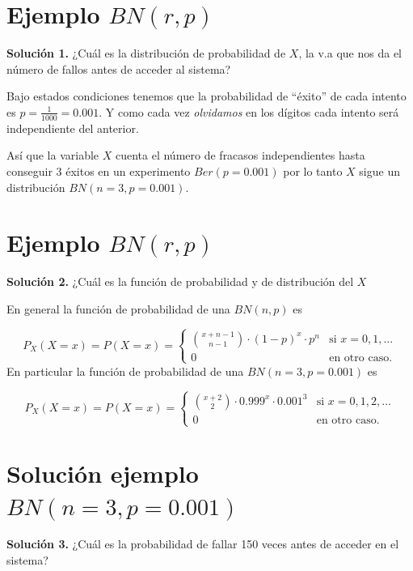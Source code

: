 \documentclass[
  letterpaper,
  DIV=11,
  numbers=noendperiod]{scrreprt}
\begin{document}
\section{\texorpdfstring{Ejemplo
\(BN(r,p)\)}{Ejemplo BN(r,p)}}\label{ejemplo-bnrp}

\textbf{Solución 1.} ¿Cuál es la distribución de probabilidad de \(X\),
la v.a que nos da el número de fallos antes de acceder al sistema?

Bajo estados condiciones tenemos que la probabilidad de ``éxito'' de
cada intento es \(p=\frac{1}{1000}=0.001\). Y como cada vez
\emph{olvidamos} en los dígitos cada intento será independiente del
anterior.

Así que la variable \(X\) cuenta el número de fracasos independientes
hasta conseguir 3 éxitos en un experimento \(Ber(p=0.001)\) por lo tanto
\(X\) sigue un distribución \(BN(n=3,p=0.001).\)

\section{\texorpdfstring{Ejemplo
\(BN(r,p)\)}{Ejemplo BN(r,p)}}\label{ejemplo-bnrp-1}

\textbf{Solución 2.} ¿Cuál es la función de probabilidad y de
distribución del \(X\)

En general la función de probabilidad de una \(BN(n,p)\) es

\[
P_X(X=x)=P(X=x)=
\left\{
\begin{array}{cc} 
{x+n-1\choose n-1} \cdot (1-p)^{x}\cdot p^n & \mbox{si }  x=0,1,\ldots \\ 0 & \mbox{en otro caso.}\end{array}\right.
\] En particular la función de probabilidad de una \(BN(n=3,p=0.001)\)
es

\[
P_X(X=x)=P(X=x)=
\left\{
\begin{array}{cc} 
{x+2\choose 2} \cdot 0.999^{x}\cdot 0.001^3 & \mbox{si }  x=0,1,2,\ldots \\ 0 & \mbox{en otro caso.}\end{array}\right.
\]

\section{\texorpdfstring{Solución ejemplo
\(BN(n=3,p=0.001)\)}{Solución ejemplo BN(n=3,p=0.001)}}\label{soluciuxf3n-ejemplo-bnn3p0.001}

\textbf{Solución 3.} ¿Cuál es la probabilidad de fallar 150 veces antes
de acceder en el sistema?
\end{document}
